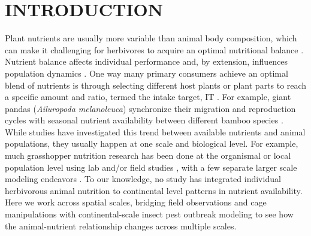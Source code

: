 \documentclass[
]{article}
\begin{document}
\section{INTRODUCTION}\label{introduction}

Plant nutrients are usually more variable than animal body composition,
which can make it challenging for herbivores to acquire an optimal
nutritional balance \citep{elser_nutritional_2000}. Nutrient balance
affects individual performance
\citep{batzli_nutritional_1986, bernays_dietary_1994} and, by extension,
influences population dynamics \citep{elser_nutritional_2000}. One way
many primary consumers achieve an optimal blend of nutrients is through
selecting different host plants or plant parts to reach a specific
amount and ratio, termed the intake target, IT \citep{simpson2012}. For
example, giant pandas (\emph{Ailuropoda melanoleuca}) synchronize their
migration and reproduction cycles with seasonal nutrient availability
between different bamboo species \citep{nie_obligate_2015}. While
studies have investigated this trend between available nutrients and
animal populations, they usually happen at one scale and biological
level. For example, much grasshopper nutrition research has been done at
the organismal or local population level using lab and/or field studies
\citep{behmer_insect_2009, cease_how_2024, le_gall_global_2019}, with a
few separate larger scale modeling endeavors
\citep{welti_nutrient_2020, zhou_increased_2019}. To our knowledge, no
study has integrated individual herbivorous animal nutrition to
continental level patterns in nutrient availability. Here we work across
spatial scales, bridging field observations and cage manipulations with
continental-scale insect pest outbreak modeling to see how the
animal-nutrient relationship changes across multiple scales.
\end{document}
